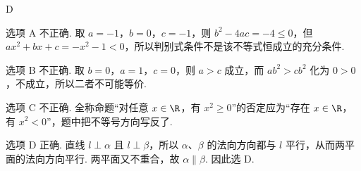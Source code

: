 \begin{answer}
D
\end{answer}

\begin{solution}
选项 A 不正确. 取 \(a=-1\)，\(b=0\)，\(c=-1\)，则 \(b^2-4ac=-4\leqslant0\)，但 \(ax^2+bx+c=-x^2-1<0\)，所以判别式条件不是该不等式恒成立的充分条件.

选项 B 不正确. 取 \(b=0\)，\(a=1\)，\(c=0\)，则 \(a>c\) 成立，而 \(ab^2>cb^2\) 化为 \(0>0\)，不成立，所以二者不可能等价.

选项 C 不正确. 全称命题“对任意 \(x\in\R\)，有 \(x^2\geqslant0\)”的否定应为“存在 \(x\in\R\)，有 \(x^2<0\)”，题中把不等号方向写反了.

选项 D 正确. 直线 \(l\perp\alpha\) 且 \(l\perp\beta\)，所以 \(\alpha\)、\(\beta\) 的法向方向都与 \(l\) 平行，从而两平面的法向方向平行. 两平面又不重合，故 \(\alpha\parallel\beta\). 因此选 D.
\end{solution}

